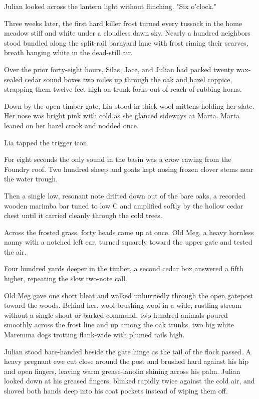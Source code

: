 Julian looked across the lantern light without flinching. "Six o'clock."

\bigskip

Three weeks later, the first hard killer frost turned every tussock in the home meadow stiff and white under a cloudless dawn sky. Nearly a hundred neighbors stood bundled along the split-rail barnyard lane with frost riming their scarves, breath hanging white in the dead-still air.

Over the prior forty-eight hours, Silas, Jace, and Julian had packed twenty wax-sealed cedar sound boxes two miles up through the oak and hazel coppice, strapping them twelve feet high on trunk forks out of reach of rubbing horns.

Down by the open timber gate, Lia stood in thick wool mittens holding her slate. Her nose was bright pink with cold as she glanced sideways at Marta. Marta leaned on her hazel crook and nodded once.

Lia tapped the trigger icon.

For eight seconds the only sound in the basin was a crow cawing from the Foundry roof. Two hundred sheep and goats kept nosing frozen clover stems near the water trough.

Then a single low, resonant note drifted down out of the bare oaks, a recorded wooden marimba bar tuned to low C and amplified softly by the hollow cedar chest until it carried cleanly through the cold trees.

Across the frosted grass, forty heads came up at once. Old Meg, a heavy hornless nanny with a notched left ear, turned squarely toward the upper gate and tested the air.

Four hundred yards deeper in the timber, a second cedar box answered a fifth higher, repeating the slow two-note call.

Old Meg gave one short bleat and walked unhurriedly through the open gatepost toward the woods. Behind her, wool brushing wool in a wide, rustling stream without a single shout or barked command, two hundred animals poured smoothly across the frost line and up among the oak trunks, two big white Maremma dogs trotting flank-wide with plumed tails high.

Julian stood bare-handed beside the gate hinge as the tail of the flock passed. A heavy pregnant ewe cut close around the post and brushed hard against his hip and open fingers, leaving warm grease-lanolin shining across his palm. Julian looked down at his greased fingers, blinked rapidly twice against the cold air, and shoved both hands deep into his coat pockets instead of wiping them off.

